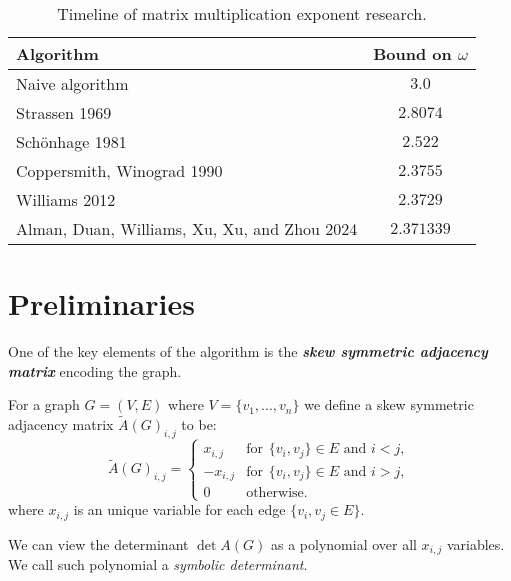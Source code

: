 \begin{table}[htbp]
\begin{center}
\begin{tabular}{ |l||c| }
\hline
\textbf{Algorithm} & \centering \textbf{Bound on $\omega$} \tabularnewline
\hline
Naive algorithm & \centering $3.0$ \tabularnewline
Strassen 1969 \cite{matrix_strassen} & \centering $2.8074$ \tabularnewline
Schönhage 1981 \cite{matrix_schonhage} & \centering $2.522$ \tabularnewline
Coppersmith, Winograd 1990 \cite{matrix_coppersmith} & \centering $2.3755$ \tabularnewline
Williams 2012 \cite{matrix_williams} & \centering $2.3729$ \tabularnewline
Alman, Duan, Williams, Xu, Xu, and Zhou 2024 \cite{matrix_latest} & \centering $2.371339$ \tabularnewline
\hline
\end{tabular}
\caption{Timeline of matrix multiplication exponent research.}
\label{tab:omega}
\end{center}
\end{table}

\section{Preliminaries}
One of the key elements of the algorithm is the \textit{\textbf{skew symmetric adjacency matrix}} encoding the graph.

\begin{definition}
For a graph $G=(V,E)$ where $V=\{v_1,...,v_n\}$ we define a skew symmetric adjacency matrix $\tilde{A}(G)_{i,j}$ to be:
\[
\tilde{A}(G)_{i,j} =
\begin{cases} 
  x_{i,j} & \text{for}\hspace{5pt} \{v_i,v_j\} \in E \text{  and  } i<j, \\
  -x_{i,j} & \text{for}\hspace{5pt} \{v_i,v_j\} \in E \text{  and  } i>j, \\
  0 & \text{otherwise.}
\end{cases}
\]
where $x_{i,j}$ is an unique variable for each edge $\{v_i,v_j \in E\}$.
\end{definition}
We can view the determinant $\det A(G)$ as a polynomial over all $x_{i,j}$ variables. We call such polynomial a \textit{symbolic determinant}.

